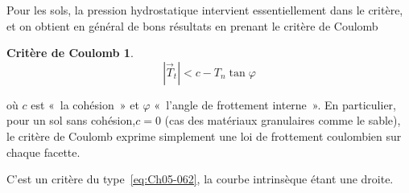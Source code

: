 Pour les sols, la pression hydrostatique intervient essentiellement dans le critère, et on obtient en général de bons résultats en prenant le critère de Coulomb 
\newtheorem*{ccoulomb}{Critère de Coulomb}
\begin{ccoulomb}
    \begin{equation}
        |\vec{T}_t| < c - T_n \tan \varphi
        \label{eq:Ch10-013}
    \end{equation}
\end{ccoulomb}
où $c$ est «~la cohésion~» et $\varphi$ «~l'angle de frottement interne~».
En particulier, pour un sol sans cohésion,$ c = 0$ (cas des matériaux granulaires comme le sable), le critère de Coulomb exprime simplement une loi de frottement coulombien sur chaque facette. 
\begin{multicols}{2}
    \centering
    \columnbreak
    C'est un critère du type~\eqref{eq:Ch05-062}, la courbe intrinsèque étant une droite. 
\end{multicols}

